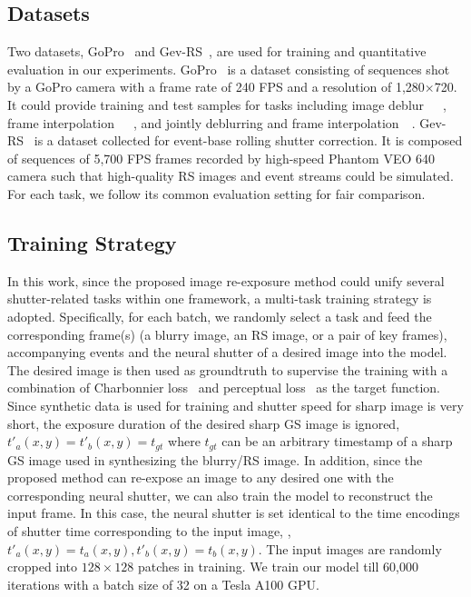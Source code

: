 \documentclass[10pt,twocolumn,letterpaper]{article}
\begin{document}
\subsection{Datasets}
Two datasets, GoPro~\cite{GoProDataset} and Gev-RS~\cite{EvUnroll}, are used for training and quantitative evaluation in our experiments. 
GoPro~\cite{GoProDataset} is a dataset consisting of sequences shot by a GoPro camera with a frame rate of 240 FPS and a resolution of 1,280$\times$720. 
It could provide training and test samples for tasks including image deblur~\cite{EFNet}~\cite{DeblurGAN}~\cite{SRN}, frame interpolation~\cite{TimeLens}~\cite{DAIN}~\cite{SloMo}, and jointly deblurring and frame interpolation~\cite{DeMFI}~\cite{TNTT}.
Gev-RS~\cite{EvUnroll} is a dataset collected for event-base rolling shutter correction. It is composed of sequences of 5,700 FPS frames recorded by high-speed Phantom VEO 640 camera such that high-quality RS images and event streams could be simulated. 
For each task, we follow its common evaluation setting for fair comparison.

\subsection{Training Strategy}
In this work, since the proposed image re-exposure method could unify several shutter-related tasks within one framework, a multi-task training strategy is adopted.
Specifically, for each batch, we randomly select a task and feed the corresponding frame(s) (\eg a blurry image, an RS image, or a pair of key frames), accompanying events and the neural shutter of a desired image into the model. The desired image is then used as groundtruth to supervise the training with a combination of Charbonnier loss~\cite{CharbonnierLoss} and perceptual loss~\cite{PerceptualLoss} 
as the target function. 
Since synthetic data is used for training and shutter speed for sharp image is very short, the exposure duration of the desired sharp GS image is ignored, \ie $t'_a(x,y)=t'_b(x,y)=t_{gt}$ where $t_{gt}$ can be an arbitrary timestamp of a sharp GS image used in synthesizing the blurry/RS image. 
In addition, since the proposed method can re-expose an image to any desired one with the corresponding neural shutter, we can also train the model to reconstruct the input frame.
In this case, the neural shutter is set identical to the time encodings of shutter time corresponding to the input image, \ie, $t'_a(x,y)=t_a(x,y), t'_b(x,y)=t_b(x,y)$.
The input images are randomly cropped into $128\times128$ patches in training. We train our model till 60,000 iterations with a batch size of 32 on a Tesla A100 GPU.
\end{document}
